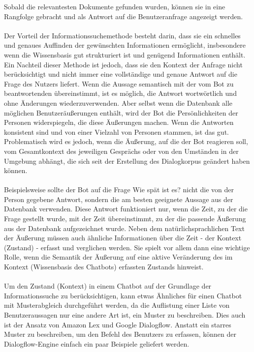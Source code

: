 Sobald die relevantesten Dokumente gefunden wurden, können sie in eine Rangfolge gebracht und als Antwort auf die Benutzeranfrage angezeigt werden.\\\\
Der Vorteil der Informationssuchemethode besteht darin, dass sie ein schnelles und genaues Auffinden der gewünschten Informationen ermöglicht, insbesondere wenn die Wissensbasis gut strukturiert ist und genügend Informationen enthält. 
Ein Nachteil dieser Methode ist jedoch, dass sie den Kontext der Anfrage nicht berücksichtigt und nicht immer eine vollständige und genaue Antwort auf die Frage des Nutzers liefert. 
Wenn die Aussage semantisch mit der vom Bot zu beantwortenden übereinstimmt, ist es möglich, die Antwort wortwörtlich und ohne Änderungen wiederzuverwenden. 
Aber selbst wenn die Datenbank alle möglichen Benutzeräußerungen enthält, wird der Bot die Persönlichkeiten der Personen widerspiegeln, die diese Äußerungen machen. 
Wenn die Antworten konsistent sind und von einer Vielzahl von Personen stammen, ist das gut. 
Problematisch wird es jedoch, wenn die Äußerung, auf die der Bot reagieren soll, vom Gesamtkontext des jeweiligen Gesprächs oder von den Umständen in der Umgebung abhängt, die sich seit der Erstellung des Dialogkorpus geändert haben können.\\\\
Beispielsweise sollte der Bot auf die Frage \glqq{}Wie spät ist es?\grqq{} nicht die von der Person gegebene Antwort, sondern die am besten geeignete Aussage aus der Datenbank verwenden. 
Diese Antwort funktioniert nur, wenn die Zeit, zu der die Frage gestellt wurde, mit der Zeit übereinstimmt, zu der die passende Äußerung aus der Datenbank aufgezeichnet wurde. 
Neben dem natürlichsprachlichen Text der Äußerung müssen auch ähnliche Informationen über die Zeit - der Kontext (Zustand) - erfasst und verglichen werden. 
Sie spielt vor allem dann eine wichtige Rolle, wenn die Semantik der Äußerung auf eine aktive Veränderung des im Kontext (Wissensbasis des Chatbots) erfassten Zustands hinweist.\\\\
Um den Zustand (Kontext) in einem Chatbot auf der Grundlage der Informationssuche zu berücksichtigen, kann etwas Ähnliches für einen Chatbot mit Musterabgleich durchgeführt werden, da die Auflistung einer Liste von Benutzeraussagen nur eine andere Art ist, ein Muster zu beschreiben. 
Dies auch ist der Ansatz von Amazon Lex und Google Dialogflow. 
Anstatt ein starres Muster zu beschreiben, um den Befehl des Benutzers zu erfassen, können der Dialogflow-Engine einfach ein paar Beispiele geliefert werden. 
